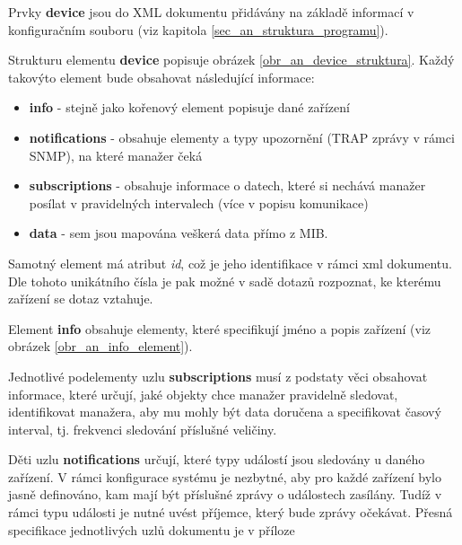Prvky \textbf{device} jsou do XML dokumentu přidávány na základě informací v konfiguračním souboru (viz kapitola \ref{sec_an_struktura_programu}).

Strukturu elementu \textbf{device} popisuje obrázek \ref{obr_an_device_struktura}. Každý takovýto element bude obsahovat následující informace:
\begin{itemize}
	\item \textbf{info} - stejně jako kořenový element popisuje dané zařízení
	\item \textbf{notifications} - obsahuje elementy a typy upozornění (TRAP zprávy v rámci SNMP), na které manažer čeká
	\item \textbf{subscriptions} - obsahuje informace o datech, které si nechává manažer posílat v pravidelných intervalech (více v popisu komunikace)
	\item \textbf{data} - sem jsou mapována veškerá data přímo z MIB.
\end{itemize}

Samotný element má atribut \textit{id}, což je jeho identifikace v rámci xml dokumentu. Dle tohoto unikátního čísla je pak možné
v sadě dotazů rozpoznat, ke kterému zařízení se dotaz vztahuje.


Element \textbf{info} obsahuje elementy, které specifikují jméno a popis zařízení (viz obrázek \ref{obr_an_info_element}).


Jednotlivé podelementy uzlu \textbf{subscriptions} musí z podstaty věci obsahovat informace, které určují, jaké objekty chce manažer pravidelně sledovat, identifikovat
manažera, aby mu mohly být data doručena a specifikovat časový interval, tj. frekvenci sledování příslušné veličiny.

Děti uzlu \textbf{notifications} určují, které typy událostí jsou sledovány u daného zařízení. V rámci konfigurace systému je nezbytné, aby pro každé zařízení
bylo jasně definováno, kam mají být příslušné zprávy o událostech zasílány. Tudíž v rámci typu události je nutné uvést příjemce, který bude zprávy očekávat. Přesná 
specifikace jednotlivých uzlů dokumentu je v příloze 

